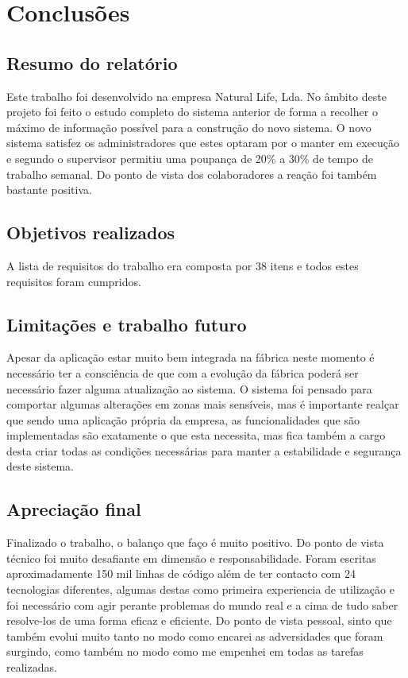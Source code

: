 \chapter{Conclusões}
\label{cap:6}
\section{Resumo do relatório}
Este trabalho foi desenvolvido na empresa Natural Life, Lda. No âmbito deste projeto foi feito o estudo completo do sistema anterior de forma a recolher o máximo de informação possível para a construção do novo sistema. O novo sistema satisfez os administradores que estes optaram por o manter em execução e segundo o supervisor permitiu uma poupança de 20\% a 30\% de tempo de trabalho semanal. Do ponto de vista dos colaboradores a reação foi também bastante positiva.


\section{Objetivos realizados}
A lista de requisitos do trabalho era composta por 38 itens e todos estes requisitos foram cumpridos.

\section{Limitações e trabalho futuro}
Apesar da aplicação estar muito bem integrada na fábrica neste momento é necessário ter a consciência de que com a evolução da fábrica poderá ser necessário fazer alguma atualização ao sistema. O sistema foi pensado para comportar algumas alterações em zonas mais sensíveis, mas é importante realçar que sendo uma aplicação própria da empresa, as funcionalidades que são implementadas são exatamente o que esta necessita, mas fica também a cargo desta criar todas as condições necessárias para manter a estabilidade e segurança deste sistema.

\section{Apreciação final}
Finalizado o trabalho, o balanço que faço é muito positivo. Do ponto de vista técnico foi muito desafiante em dimensão e responsabilidade. Foram escritas aproximadamente 150 mil linhas de código além de ter contacto com 24 tecnologias diferentes, algumas destas como primeira experiencia de utilização e foi necessário com agir perante problemas do mundo real e a cima de tudo saber resolve-los de uma forma eficaz e eficiente.
Do ponto de vista pessoal, sinto que também evolui muito tanto no modo como encarei as adversidades que foram surgindo, como também no modo como me empenhei em todas as tarefas realizadas.